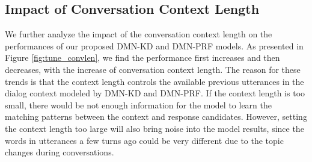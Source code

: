 %
%



\subsection{\textbf{Impact of Conversation Context Length}}
We further analyze the impact of the conversation context length on the performances of our proposed DMN-KD and DMN-PRF models. 
As presented in Figure \ref{fig:tune_convlen}, we find the performance first increases and then decreases, with the increase of conversation context length. The reason for these trends is that the context length controls the available previous utterances in the dialog context modeled by DMN-KD and DMN-PRF. If the context length is too small, there would be not enough information for the model to learn the matching patterns between the context and response candidates. However, setting the context length too large will also bring noise into the model results, since the words in utterances a few turns ago could be very different due to the topic changes during conversations. %


